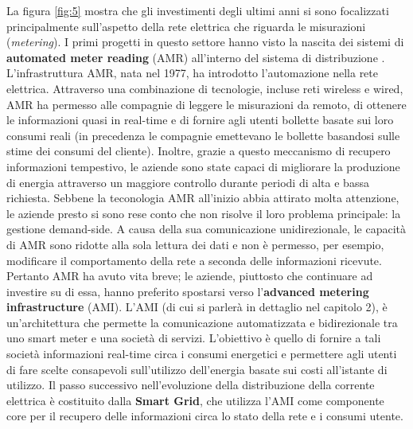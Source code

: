 La figura \ref{fig:5} mostra che gli investimenti degli ultimi anni si sono focalizzati principalmente sull'aspetto della rete elettrica che riguarda le misurazioni (\textit{metering}). \newline I primi progetti in questo settore hanno visto la nascita dei sistemi di \textbf{automated meter reading} (AMR) all'interno del sistema di distribuzione \cite{securingSG}. \newline
L'infrastruttura AMR, nata nel 1977, ha introdotto l'automazione nella rete elettrica. Attraverso una combinazione di tecnologie, incluse reti wireless e wired,   AMR ha permesso alle compagnie di leggere le misurazioni da remoto, di ottenere le informazioni quasi in real-time e di fornire agli utenti bollette basate sui loro consumi reali (in precedenza le compagnie emettevano le bollette basandosi sulle stime dei consumi del cliente).  \newline Inoltre, grazie a questo meccanismo di recupero informazioni tempestivo, le aziende sono state capaci di migliorare la produzione di energia attraverso un maggiore controllo durante periodi di alta e bassa richiesta. \newline \newline
Sebbene la teconologia AMR all'inizio abbia attirato molta attenzione, le aziende presto si sono rese conto che non risolve il loro problema principale: la gestione demand-side. A causa della sua comunicazione unidirezionale, le capacità di AMR sono ridotte alla sola lettura dei dati e non è permesso, per esempio, modificare il comportamento della rete a seconda delle informazioni ricevute. \newline Pertanto AMR ha avuto vita breve; le aziende, piuttosto che continuare ad investire su di essa, hanno preferito spostarsi verso l'\textbf{advanced metering infrastructure} (AMI). \newline
L'AMI (di cui si parlerà in dettaglio nel capitolo 2), è un'architettura che permette la comunicazione automatizzata e bidirezionale tra uno smart meter e una società di servizi. L'obiettivo è quello di fornire a tali società informazioni real-time circa i consumi energetici e permettere agli utenti di fare scelte consapevoli sull'utilizzo dell'energia basate sui costi all'istante di utilizzo.
\newline
\newline
Il passo successivo nell'evoluzione della distribuzione della corrente elettrica è costituito dalla \textbf{Smart Grid}, che utilizza l'AMI come componente core per il recupero delle informazioni circa lo stato della rete e i consumi utente.
\newpage

